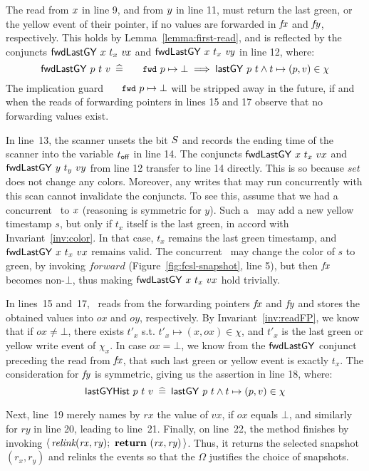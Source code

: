 \documentclass[a4paper,UKenglish]{lipics-v2016}
\newcommand{\aux}[1]{\textit{#1}}
\newcommand{\kw}[1]{\text{\textbf{#1}}}
\newcommand{\hist}{\chi}
\newcommand{\eqdef}{\mathrel{\:\widehat{=}\:}}
\newcommand{\hpts}{\mapsto}
\newcommand{\stableorder}{\Omega}
\def\lgVy{\ensuremath{\mathsf{lastGY}}}
\newcommand{\var}[1]{\mathit{#1}}
\def\lat{\langle}
\def\rat{\rangle}
\theoremstyle{definition}
\begin{document}
The read from $x$ in line 9, and from $y$ in line 11, must return
the last green, or the yellow event of their pointer, if no values are
forwarded in $\mathit{fx}$ and $\mathit{fy}$, respectively. This holds by
Lemma~\ref{lemma:first-read}, and is reflected by the conjuncts
$\botLGY\ x\ t_x\ \var{vx}$ and $\botLGY\ x\ t_x\ \var{vy}$ in line
12, where:
%
\[
 \hfill \botLGY\ p\ t\ v \eqdef \aleksfwdp{p} \hpts \bot
 \implies \lgVy\ p\ t \wedge t \hpts (p, v) \in \hist \hfill
\]
%
The implication guard $\aleksfwdp{p} \hpts \bot$ will be stripped away
in the future, if and when the reads of forwarding pointers in lines
15 and 17 observe that no forwarding values exist.

In line~13, the scanner unsets the bit $S$ and records the ending
time of the scanner into the variable $t_{\mathsf{off}}$ in line 14. The
conjuncts $\botLGY\ x\ t_x\ vx$ and ${\mathsf{fwdLastGY}}\ y\ t_y\ vy$ from line 12
transfer to line 14 directly. This is so because $\aux{set}$ does not
change any colors. Moreover, any writes that may run concurrently with
this scan cannot invalidate the conjuncts. To see this, assume that we
had a concurrent \jywrite\ to $x$ (reasoning is symmetric for $y$).
Such a \jywrite\ may add a new yellow timestamp $s$, but only if $t_x$
itself is the last green, in accord with Invariant~\ref{inv:color}. In
that case, $t_x$ remains the last green timestamp, and
$\botLGY\ x\ t_x\ vx$ remains valid. The concurrent \jywrite\ may
change the color of $s$ to green, by invoking $\aux{forward}$
(Figure~\ref{fig:fcsl-snapshot}, line 5), but then $\mathit{fx}$ becomes
non-$\bot$, thus making $\botLGY\ x\ t_x\ vx$ hold trivially.

In lines~15 and~17, \jyscan\ reads from the forwarding pointers $\mathit{fx}$
and $\mathit{fy}$ and stores the obtained values into $ox$ and $oy$,
respectively.  By Invariant~\ref{inv:readFP}, we know that if $ox \neq
\bot$, there exists $t'_x$ s.t. $t'_x \hpts (x,ox) \in \hist$, and
$t'_x$ is the last green or yellow write event of $\hist_x$.  In case
$ox = \bot$, we know from the ${\mathsf{fwdLastGY}}$ conjunct preceding the read
from $\mathit{fx}$, that such last green or yellow event is exactly $t_x$.
%
The consideration for $\mathit{fy}$ is symmetric, giving us the assertion in
line 18, where:
%
\[
\hfill\histLGY\ p\ t\ v \eqdef
\lgVy\ p\ t \wedge t \hpts (p, v) \in \hist\hfill
\]

Next, line~19 merely names by $rx$ the value of $vx$, if $ox$ equals
$\bot$, and similarly for $ry$ in line 20, leading to
line~21. Finally, on line~22, the method finishes by invoking
$\lat\,\aux{relink}(\var{rx}, \var{ry});\ \kw{return}\ (\var{rx},
\var{ry})\,\rat$. Thus, it returns the selected snapshot $(r_x,r_y)$
and relinks the events so that the $\stableorder$ justifies the choice
of snapshots.
\end{document}
